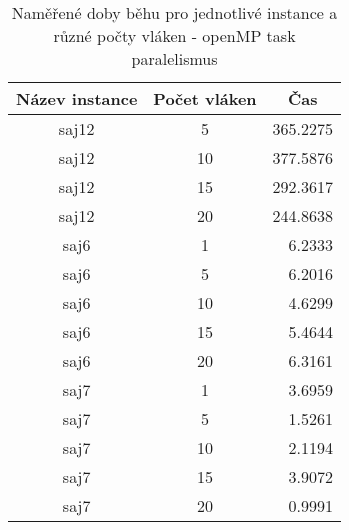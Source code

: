 \documentclass{article} \oddsidemargin=-5mm
\begin{document}
\begin{table}[h]
\centering
\begin{tabular}{|c|c|r|}
\hline
\rowcolor[HTML]{C0C0C0} 
\textbf{Název instance} & \textbf{Počet vláken} & \multicolumn{1}{c|}{\cellcolor[HTML]{C0C0C0}\textbf{Čas}} \\ \hline
saj12                   & 5                     & 365.2275                                                  \\ \hline
saj12                   & 10                    & 377.5876                                                  \\ \hline
saj12                   & 15                    & 292.3617                                                  \\ \hline
saj12                   & 20                    & 244.8638                                                  \\ \hline
saj6                    & 1                     & 6.2333                                                    \\ \hline
saj6                    & 5                     & 6.2016                                                    \\ \hline
saj6                    & 10                    & 4.6299                                                    \\ \hline
saj6                    & 15                    & 5.4644                                                    \\ \hline
saj6                    & 20                    & 6.3161                                                    \\ \hline
saj7                    & 1                     & 3.6959                                                    \\ \hline
saj7                    & 5                     & 1.5261                                                    \\ \hline
saj7                    & 10                    & 2.1194                                                    \\ \hline
saj7                    & 15                    & 3.9072                                                    \\ \hline
saj7                    & 20                    & 0.9991                                                    \\ \hline
\end{tabular}
\caption{Naměřené doby běhu pro jednotlivé instance a různé počty vláken - openMP task paralelismus}
\label{table-ompTask}
\end{table}
\end{document}
